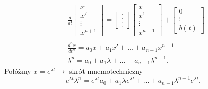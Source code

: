 \documentclass[../main.tex]{subfiles}
\begin{document}
\begin{przyklad}
\begin{align*}
                &\frac{d}{dt} \begin{bmatrix} x\\x'\\ \vdots \\ x^{n+1} \end{bmatrix} = \begin{bmatrix} . \\ . \\ . \\ . \end{bmatrix}\begin{bmatrix} x\\x^1\\ \vdots \\ x^{n+1} \end{bmatrix} + \begin{bmatrix} 0\\ \vdots \\ b(t) \end{bmatrix}\\
                \\
                &\frac{d^nx}{dt^n} = a_0x + a_1x' + \ldots + a_{n-1}x^{n-1}\\
                &\lambda^n = a_0+a_1\lambda+\ldots+a_{n-1}\lambda^{n-1}
            .\end{align*}
            Połóżmy $x = e^{\lambda t}\to$ skrót mnemotechniczny\\
            \[
            e^{\lambda t}\lambda^n = e^{\lambda t}a_0 + a_1 \lambda e^{\lambda t} + \ldots + a_{n-1}\lambda^{n-1}e^{\lambda t}
            .\]
        \end{przyklad}
\end{document}
